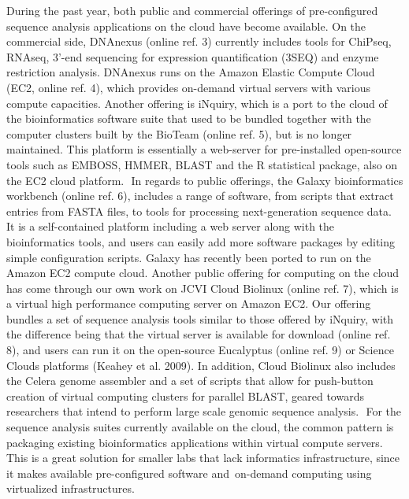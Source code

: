 \documentclass[10pt]{bmc_article}
\newenvironment{bmcformat}{\begin{raggedright}\baselineskip20pt\sloppy\setboolean{publ}{false}}{\end{raggedright}\baselineskip20pt\sloppy}
\begin{document}
\begin{bmcformat}
      During the past year, both public and commercial offerings of pre-configured sequence
      analysis applications on the cloud have become available. On the commercial side, DNAnexus
      (online ref. 3) currently includes tools for ChiPseq, RNAseq, 3'-end sequencing for
      expression quantification (3SEQ) and enzyme restriction analysis. DNAnexus runs on the
      Amazon Elastic Compute Cloud (EC2, online ref. 4), which provides on-demand virtual
      servers with various compute capacities. Another offering is iNquiry, which is a port to
      the cloud of the bioinformatics software suite that used to be bundled together with the
      computer clusters built by the BioTeam (online ref. 5), but is no longer maintained. This
      platform is essentially a web-server for pre-installed open-source tools such as EMBOSS,
      HMMER, BLAST and the R statistical package, also on the EC2 cloud platform.  In regards to
      public offerings, the Galaxy bioinformatics workbench (online ref. 6), includes a range of
      software, from scripts that extract entries from FASTA files, to tools for processing
      next-generation sequence data. It is a self-contained platform including a web server
      along with the bioinformatics tools, and users can easily add more software packages by
      editing simple configuration scripts. Galaxy has recently been ported to run on the Amazon
      EC2 compute cloud. Another public offering for computing on the cloud has come through our
      own work on JCVI Cloud Biolinux (online ref. 7), which is a virtual high performance
      computing server on Amazon EC2. Our offering bundles a set of sequence analysis tools
      similar to those offered by iNquiry, with the difference being that the virtual server is
      available for download (online ref. 8), and users can run it on the open-source Eucalyptus
      (online ref. 9) or Science Clouds platforms (Keahey et al. 2009). In addition, Cloud
      Biolinux also includes the Celera genome assembler and a set of scripts that allow for
      push-button creation of virtual computing clusters for parallel BLAST, geared towards
      researchers that intend to perform large scale genomic sequence analysis.  For the
      sequence analysis suites currently available on the cloud, the common pattern is packaging
      existing bioinformatics applications within virtual compute servers. This is a great
      solution for smaller labs that lack informatics infrastructure, since it makes available
      pre-configured software and on-demand computing using virtualized infrastructures.

\end{bmcformat}
\end{document}
